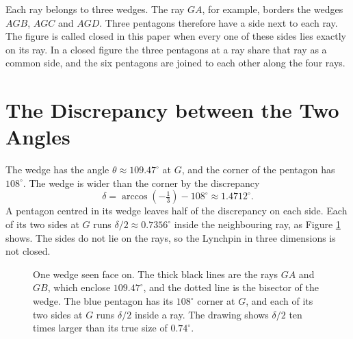 \documentclass[a4paper,12pt]{article}
\begin{document}
Each ray belongs to three wedges. The ray \( GA \), for example, borders the wedges \( AGB \), \( AGC \) and \( AGD \). Three pentagons therefore have a side next to each ray. The figure is called closed in this paper when every one of these sides lies exactly on its ray. In a closed figure the three pentagons at a ray share that ray as a common side, and the six pentagons are joined to each other along the four rays.


\section{The Discrepancy between the Two Angles}
The wedge has the angle \( \theta \approx 109.47^\circ \) at \( G \), and the corner of the pentagon has \( 108^\circ \). The wedge is wider than the corner by the discrepancy
\[
\delta = \arccos\left(-\tfrac{1}{3}\right) - 108^\circ \approx 1.4712^\circ .
\]
A pentagon centred in its wedge leaves half of the discrepancy on each side. Each of its two sides at \( G \) runs \( \delta/2 \approx 0.7356^\circ \) inside the neighbouring ray, as Figure \ref{fig:wedge} shows. The sides do not lie on the rays, so the Lynchpin in three dimensions is not closed.

\begin{figure}[h]
\centering
{}
\caption{One wedge seen face on. The thick black lines are the rays \( GA \) and \( GB \), which enclose \( 109.47^\circ \), and the dotted line is the bisector of the wedge. The blue pentagon has its \( 108^\circ \) corner at \( G \), and each of its two sides at \( G \) runs \( \delta/2 \) inside a ray. The drawing shows \( \delta/2 \) ten times larger than its true size of \( 0.74^\circ \).}
\label{fig:wedge}
\end{figure}
\end{document}
